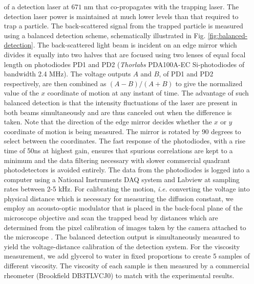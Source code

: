 \documentclass[english,aps, twocolumn, pre,superscriptaddress]{revtex4-1}
\begin{document}
of a detection laser at $671$ nm that co-propagates with the trapping
laser. The detection laser power is maintained at much lower levels
than that required to trap a particle. The back-scattered signal from
the trapped particle is measured using a balanced detection scheme,
schematically illustrated in Fig. \ref{fig:balanced-detection}. The
back-scattered light beam is incident on an edge mirror which divides
it equally into two halves that are focused using two lenses of equal
focal length on photodiodes PD1 and PD2 (\emph{Thorlabs} PDA100A-EC
Si-photodiodes of bandwidth 2.4 MHz). The voltage outputs $A$ and
$B$, of PD1 and PD2 respectively, are then combined as $(A-B)/(A+B)$
to give the normalized value of the $x$ coordinate of motion at any
instant of time. The advantage of such balanced detection is that
the intensity fluctuations of the laser are present in both beams
simultaneously and are thus canceled out when the difference is taken.
Note that the direction of the edge mirror decides whether the $x$
or $y$ coordinate of motion is being measured. The mirror is rotated
by $90$ degrees to select between the coordinates. The fast response
of the photodiodes, with a rise time of 50ns at highest gain, ensures
that spurious correlations are kept to a minimum and the data filtering
necessary with slower commercial quadrant photodetectors is avoided
entirely. The data from the photodiodes is logged into a computer
using a National Instruments DAQ system and Labview at sampling rates
between 2-5 kHz. For calibrating the motion, \emph{i.e.} converting
the voltage into physical distance which is necessary for measuring
the diffusion constant, we employ an acousto-optic modulator that
is placed in the back-focal plane of the microscope objective and
scan the trapped bead by distances which are determined from the pixel
calibration of images taken by the camera attached to the microscope
\cite{rsi12}. The balanced detection output is simultaneously measured
to yield the voltage-distance calibration of the detection system.
For the viscosity measurement, we add glycerol to water in fixed proportions
to create 5 samples of different viscosity. The viscosity of each
sample is then measured by a commercial rheometer (Brookfield DB3TLVCJ0)
to match with the experimental results.
\end{document}
